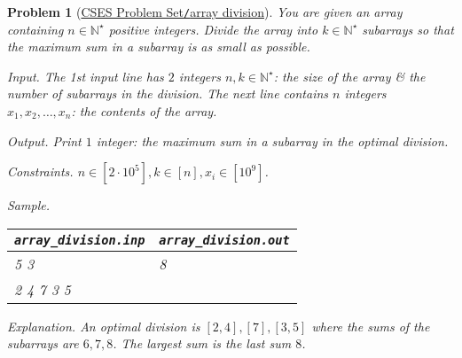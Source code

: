 \documentclass{article}
\newtheorem{problem}{Problem}
\begin{document}
\begin{problem}[\href{https://cses.fi/problemset/task/1085}{CSES Problem Set{\tt/}array division}]
    You are given an array containing $n\in\mathbb{N}^\star$ positive integers. Divide the array into $k\in\mathbb{N}^\star$ subarrays so that the maximum sum in a subarray is as small as possible.
    \item {\sf Input.} The 1st input line has $2$ integers $n,k\in\mathbb{N}^\star$: the size of the array \& the number of subarrays in the division. The next line contains $n$ integers $x_1,x_2,\ldots,x_n$: the contents of the array.
    \item {\sf Output.} Print $1$ integer: the maximum sum in a subarray in the optimal division.
    \item {\sf Constraints.} $n\in[2\cdot10^5],k\in[n],x_i\in[10^9]$.
    \item {\sf Sample.}
    \begin{table}[H]
        \centering
        \begin{tabular}{|l|l|}
            \hline
            \verb|array_division.inp| & \verb|array_division.out| \\
            \hline
            5 3 & 8 \\
            2 4 7 3 5 & \\
            \hline
        \end{tabular}
    \end{table}
    \item {\sf Explanation.} An optimal division is $[2,4],[7],[3,5]$ where the sums of the subarrays are $6,7,8$. The largest sum is the last sum $8$.
\end{problem}
\end{document}
